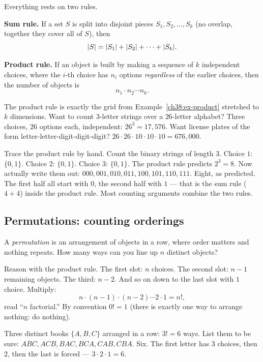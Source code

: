 Everything rests on two rules.

\begin{formalbox}
\textbf{Sum rule.} If a set $S$ is split into disjoint pieces
$S_1, S_2, \dots, S_k$ (no overlap, together they cover all of $S$), then
\[
\lvert S\rvert = \lvert S_1\rvert + \lvert S_2\rvert + \cdots + \lvert S_k\rvert.
\]

\textbf{Product rule.} If an object is built by making a sequence of $k$ independent
choices, where the $i$-th choice has $n_i$ options \emph{regardless} of the earlier
choices, then the number of objects is
\[
n_1 \cdot n_2 \cdots n_k.
\]
\end{formalbox}

The product rule is exactly the grid from Example~\ref{ch38:ex-product} stretched to
$k$ dimensions. Want to count $3$-letter strings over a $26$-letter alphabet? Three
choices, $26$ options each, independent: $26^3 = 17{,}576$. Want license plates of
the form letter-letter-digit-digit-digit? $26 \cdot 26 \cdot 10 \cdot 10 \cdot 10 =
676{,}000$.

\begin{labbox}
Trace the product rule by hand. Count the binary strings of length $3$. Choice $1$:
$\{0,1\}$. Choice $2$: $\{0,1\}$. Choice $3$: $\{0,1\}$. The product rule predicts
$2^3 = 8$. Now actually write them out: $000, 001, 010, 011, 100, 101, 110, 111$.
Eight, as predicted. The first half all start with $0$, the
second half with $1$ --- that is the sum rule ($4 + 4$) inside the product
rule. Most counting arguments combine the two rules.
\end{labbox}

\subsection{Permutations: counting orderings}

A \emph{permutation} is an arrangement of objects in a row, where order matters and
nothing repeats. How many ways can you line up $n$ distinct objects?

Reason with the product rule. The first slot: $n$ choices. The second slot: $n-1$
remaining objects. The third: $n-2$. And so on down to the last slot with $1$ choice.
Multiply:
\[
n \cdot (n-1) \cdot (n-2) \cdots 2 \cdot 1 = n!,
\]
read ``$n$ factorial.'' By convention $0! = 1$ (there is exactly one way to arrange
nothing: do nothing).

\begin{example}
\label{ch38:ex-perm}
Three distinct books $\{A, B, C\}$ arranged in a row: $3! = 6$ ways. List them to be
sure: $ABC, ACB, BAC, BCA, CAB, CBA$. Six. The first letter has $3$ choices, then $2$,
then the last is forced --- $3 \cdot 2 \cdot 1 = 6$.
\end{example}

